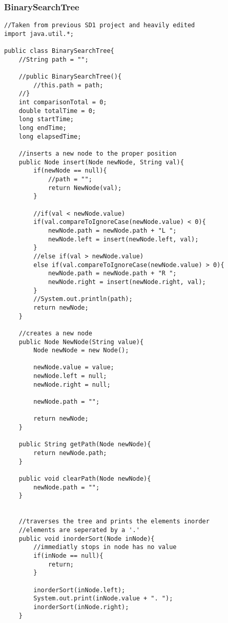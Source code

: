 \documentclass[10pt]{article}
\begin{document}
\subsubsection{BinarySearchTree}
\lstset{numbers=left, numberstyle=\tiny, stepnumber=1, numbersep=5pt, basicstyle=\footnotesize\ttfamily}
\begin{lstlisting}[frame=single, ]  
//Taken from previous SD1 project and heavily edited
import java.util.*;

public class BinarySearchTree{
    //String path = "";

    //public BinarySearchTree(){
        //this.path = path;
    //}
    int comparisonTotal = 0;
    double totalTime = 0;
    long startTime;
    long endTime;
    long elapsedTime;

    //inserts a new node to the proper position
    public Node insert(Node newNode, String val){
        if(newNode == null){
            //path = "";
            return NewNode(val);
        }
       
        //if(val < newNode.value)
        if(val.compareToIgnoreCase(newNode.value) < 0){
            newNode.path = newNode.path + "L ";
            newNode.left = insert(newNode.left, val);
        }
        //else if(val > newNode.value) 
        else if(val.compareToIgnoreCase(newNode.value) > 0){
            newNode.path = newNode.path + "R ";
            newNode.right = insert(newNode.right, val);
        }
        //System.out.println(path);
        return newNode;
    }
  
    //creates a new node
    public Node NewNode(String value){
        Node newNode = new Node();

        newNode.value = value;
        newNode.left = null;
        newNode.right = null;

        newNode.path = "";

        return newNode;
    }

    public String getPath(Node newNode){
        return newNode.path;
    }

    public void clearPath(Node newNode){
        newNode.path = "";
    }


    //traverses the tree and prints the elements inorder
    //elements are seperated by a '.'
    public void inorderSort(Node inNode){
        //immediatly stops in node has no value
        if(inNode == null){
            return;
        }
    
        inorderSort(inNode.left);
        System.out.print(inNode.value + ". ");
        inorderSort(inNode.right);
    }


\end{lstlisting}
\end{document}
